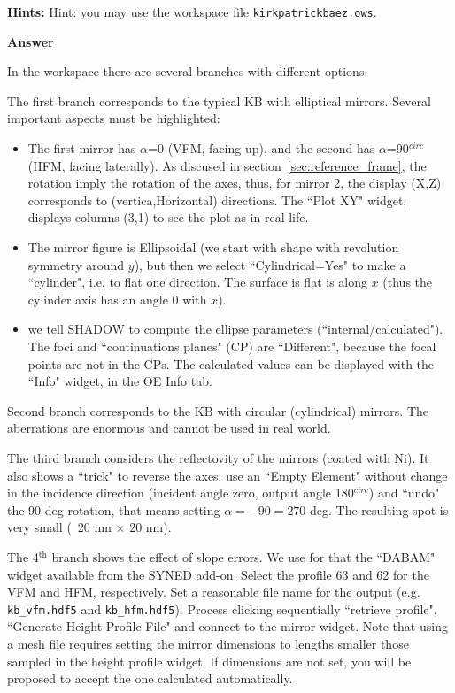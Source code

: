 \textbf{Hints:} Hint: you may use the workspace file {\tt kirkpatrickbaez.ows}. 


\textbf{Answer}

In the workspace there are several branches with different options:

The first branch corresponds to the typical KB with elliptical mirrors. Several important aspects must be highlighted:
\begin{itemize}
    \item The first mirror has $\alpha$=0 (VFM, facing up), and the second has $\alpha$=90$^{circ}$ (HFM, facing laterally).  As discused in section~\ref{sec:reference_frame}, the rotation imply the rotation of the axes, thus, for mirror 2, the display (X,Z) corresponds to (vertica,Horizontal) directions. The ``Plot XY" widget, displays columns (3,1) to see the plot as in real life.
    \item The mirror figure is Ellipsoidal (we start with shape with revolution symmetry around $y$), but then we select ``Cylindrical=Yes" to make a ``cylinder", i.e. to flat one direction. The surface is flat is along $x$ (thus the cylinder axis has an angle 0 with $x$).
    \item we tell SHADOW to compute the ellipse parameters (``internal/calculated"). The foci and ``continuations planes" (CP) are ``Different", because the focal points are not in the CPs. The calculated values can be displayed with the ``Info" widget, in the OE Info tab.
\end{itemize}



Second branch corresponds to the KB with circular (cylindrical) mirrors. The aberrations are enormous and cannot be used in real world. 

The third branch considers the reflectovity of the mirrors (coated with Ni). It also shows a ``trick" to reverse the axes: use an ``Empty Element" without change in the incidence direction (incident angle zero, output angle 180$^{circ}$) and ``undo" the 90 deg rotation, that means setting $\alpha=-90=270$ deg. The resulting spot is very small (~20 nm $\times$ 20 nm).

The 4$^\text{th}$ branch shows the effect of slope errors. We use for that the ``DABAM" widget available from the SYNED add-on. Select the profile 63 and 62 for the VFM and HFM, respectively.  Set a reasonable file name for the output (e.g. {\tt kb\_vfm.hdf5} and {\tt kb\_hfm.hdf5}). Process clicking sequentially ``retrieve profile", ``Generate Height Profile File" and connect to the mirror widget.
Note that using a mesh file requires setting the mirror dimensions to lengths smaller those sampled in the height profile widget. If dimensions are not set, you will be proposed to accept the one calculated automatically. 


